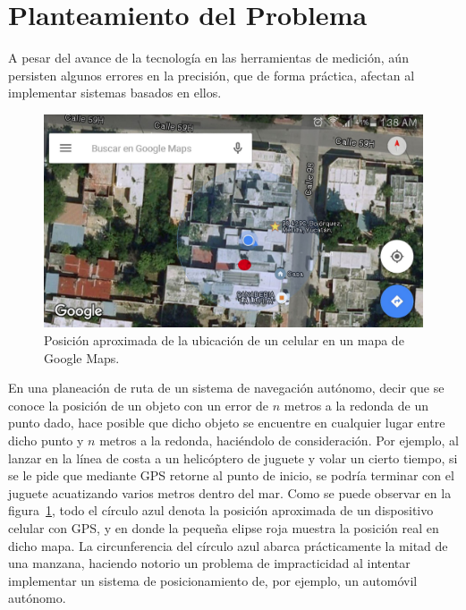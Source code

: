 \section{Planteamiento del Problema}
A pesar del avance de la tecnología en las herramientas de medición, aún persisten algunos errores en la precisión, que de forma práctica, afectan al implementar sistemas basados en ellos. \\

\begin{figure}[H]
\centering
\includegraphics[scale=0.2]{Figures/Pred}
\caption[Posición de celular en mapa.]{Posición aproximada de la ubicación de un celular en un mapa de Google Maps.}
\label{fig:Prec}
\end{figure}

En una planeación de ruta de un sistema de navegación autónomo, decir que se conoce la posición de un objeto con un error de $n$ metros a la redonda de un punto dado, hace posible que dicho objeto se encuentre en cualquier lugar entre dicho punto y $n$ metros a la redonda, haciéndolo de consideración. Por ejemplo, al lanzar en la línea de costa a un helicóptero de juguete y volar un cierto tiempo, si se le pide que mediante GPS retorne al punto de inicio, se podría terminar con el juguete acuatizando varios metros dentro del mar. Como se puede observar en la figura~\ref{fig:Prec}, todo el círculo azul denota la posición aproximada de un dispositivo celular con GPS, y en donde la pequeña elipse roja muestra la posición real en dicho mapa. La circunferencia del círculo azul abarca prácticamente la mitad de una manzana, haciendo notorio un problema de impracticidad al intentar implementar un sistema de posicionamiento de, por ejemplo, un automóvil autónomo.


